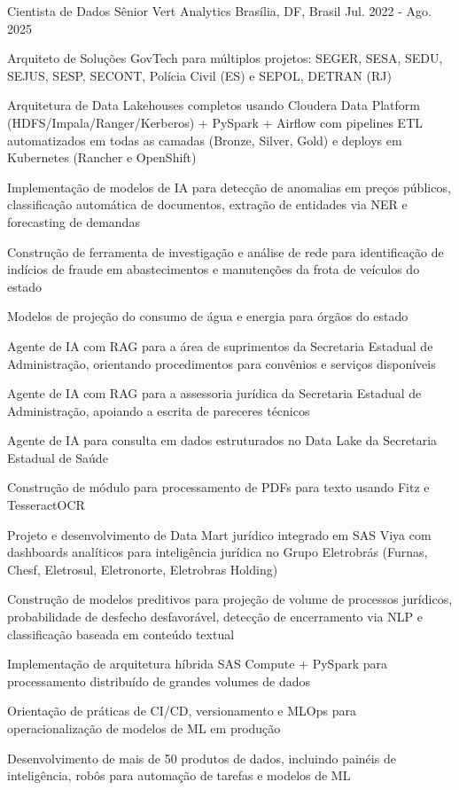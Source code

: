 \begin{cventries}
  \cventry
    {Cientista de Dados Sênior} %
    {Vert Analytics} %
    {Brasília, DF, Brasil} %
    {Jul. 2022 - Ago. 2025} %
    {
      \begin{cvitems} %
        \item {Arquiteto de Soluções GovTech para múltiplos projetos: SEGER, SESA, SEDU, SEJUS, SESP, SECONT, Polícia Civil (ES) e SEPOL, DETRAN (RJ)}
        \item {Arquitetura de Data Lakehouses completos usando Cloudera Data Platform (HDFS/Impala/Ranger/Kerberos) + PySpark + Airflow com pipelines ETL automatizados em todas as camadas (Bronze, Silver, Gold) e deploys em Kubernetes (Rancher e OpenShift)}
        \item {Implementação de modelos de IA para detecção de anomalias em preços públicos, classificação automática de documentos, extração de entidades via NER e forecasting de demandas}
        \item {Construção de ferramenta de investigação e análise de rede para identificação de indícios de fraude em abastecimentos e manutenções da frota de veículos do estado}
        \item {Modelos de projeção do consumo de água e energia para órgãos do estado}
        \item {Agente de IA com RAG para a área de suprimentos da Secretaria Estadual de Administração, orientando procedimentos para convênios e serviços disponíveis}
        \item {Agente de IA com RAG para a assessoria jurídica da Secretaria Estadual de Administração, apoiando a escrita de pareceres técnicos}
        \item {Agente de IA para consulta em dados estruturados no Data Lake da Secretaria Estadual de Saúde}
        \item {Construção de módulo para processamento de PDFs para texto usando Fitz e TesseractOCR}
        \item {Projeto e desenvolvimento de Data Mart jurídico integrado em SAS Viya com dashboards analíticos para inteligência jurídica no Grupo Eletrobrás (Furnas, Chesf, Eletrosul, Eletronorte, Eletrobras Holding)}
        \item {Construção de modelos preditivos para projeção de volume de processos jurídicos, probabilidade de desfecho desfavorável, detecção de encerramento via NLP e classificação baseada em conteúdo textual}
        \item {Implementação de arquitetura híbrida SAS Compute + PySpark para processamento distribuído de grandes volumes de dados}
        \item {Orientação de práticas de CI/CD, versionamento e MLOps para operacionalização de modelos de ML em produção}
        \item {Desenvolvimento de mais de 50 produtos de dados, incluindo painéis de inteligência, robôs para automação de tarefas e modelos de ML}
      \end{cvitems}
    }


\end{cventries}
